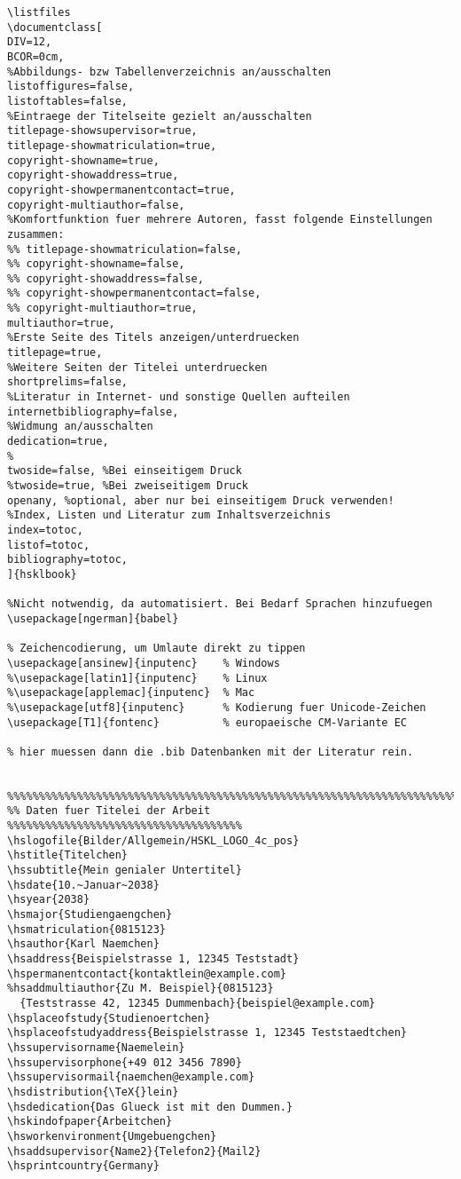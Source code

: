 \begin{verbatim}
\listfiles
\documentclass[
DIV=12,
BCOR=0cm,
%Abbildungs- bzw Tabellenverzeichnis an/ausschalten
listoffigures=false,
listoftables=false,
%Eintraege der Titelseite gezielt an/ausschalten
titlepage-showsupervisor=true,
titlepage-showmatriculation=true,
copyright-showname=true,
copyright-showaddress=true,
copyright-showpermanentcontact=true,
copyright-multiauthor=false,
%Komfortfunktion fuer mehrere Autoren, fasst folgende Einstellungen zusammen:
%% titlepage-showmatriculation=false,
%% copyright-showname=false,
%% copyright-showaddress=false,
%% copyright-showpermanentcontact=false,
%% copyright-multiauthor=true,
multiauthor=true,
%Erste Seite des Titels anzeigen/unterdruecken
titlepage=true,
%Weitere Seiten der Titelei unterdruecken
shortprelims=false,
%Literatur in Internet- und sonstige Quellen aufteilen
internetbibliography=false,
%Widmung an/ausschalten
dedication=true,
%
twoside=false, %Bei einseitigem Druck
%twoside=true, %Bei zweiseitigem Druck
openany, %optional, aber nur bei einseitigem Druck verwenden!
%Index, Listen und Literatur zum Inhaltsverzeichnis
index=totoc,
listof=totoc,
bibliography=totoc,
]{hsklbook}

%Nicht notwendig, da automatisiert. Bei Bedarf Sprachen hinzufuegen
\usepackage[ngerman]{babel}

% Zeichencodierung, um Umlaute direkt zu tippen
\usepackage[ansinew]{inputenc}    % Windows
%\usepackage[latin1]{inputenc}    % Linux
%\usepackage[applemac]{inputenc}  % Mac
%\usepackage[utf8]{inputenc}      % Kodierung fuer Unicode-Zeichen
\usepackage[T1]{fontenc}          % europaeische CM-Variante EC

% hier muessen dann die .bib Datenbanken mit der Literatur rein.


%%%%%%%%%%%%%%%%%%%%%%%%%%%%%%%%%%%%%%%%%%%%%%%%%%%%%%%%%%%%%%%%%%%%%%%
%% Daten fuer Titelei der Arbeit  %%%%%%%%%%%%%%%%%%%%%%%%%%%%%%%%%%%%%
\hslogofile{Bilder/Allgemein/HSKL_LOGO_4c_pos}
\hstitle{Titelchen}
\hssubtitle{Mein genialer Untertitel}
\hsdate{10.~Januar~2038}
\hsyear{2038}
\hsmajor{Studiengaengchen}
\hsmatriculation{0815123}
\hsauthor{Karl Naemchen}
\hsaddress{Beispielstrasse 1, 12345 Teststadt}
\hspermanentcontact{kontaktlein@example.com}
%hsaddmultiauthor{Zu M. Beispiel}{0815123}
  {Teststrasse 42, 12345 Dummenbach}{beispiel@example.com}
\hsplaceofstudy{Studienoertchen}
\hsplaceofstudyaddress{Beispielstrasse 1, 12345 Teststaedtchen}
\hssupervisorname{Naemelein}
\hssupervisorphone{+49 012 3456 7890}
\hssupervisormail{naemchen@example.com}
\hsdistribution{\TeX{}lein}
\hsdedication{Das Glueck ist mit den Dummen.}
\hskindofpaper{Arbeitchen}
\hsworkenvironment{Umgebuengchen}
\hsaddsupervisor{Name2}{Telefon2}{Mail2}
\hsprintcountry{Germany}


\end{verbatim}

